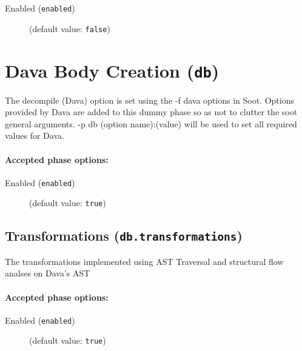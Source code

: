 \documentclass{article}
\begin{document}
\begin{description}

\item[Enabled ({\tt enabled})]
(default value: {\tt false})






\end{description}

\section{Dava Body Creation ({\tt db})}

The decompile (Dava) option is set using the -f dava options in Soot.
Options provided by Dava are added to this dummy phase so as not to clutter the soot general arguments.
-p db (option name):(value) will be used to set all required values for Dava. 
                                

\paragraph{Accepted phase options:} 

\begin{description}

\item[Enabled ({\tt enabled})]
(default value: {\tt true})






\end{description}

\subsection{Transformations ({\tt db.transformations})}

					The transformations implemented using AST Traversal and structural flow analses on Dava's AST
					

\paragraph{Accepted phase options:} 

\begin{description}

\item[Enabled ({\tt enabled})]
(default value: {\tt true})






\end{description}
\end{document}
